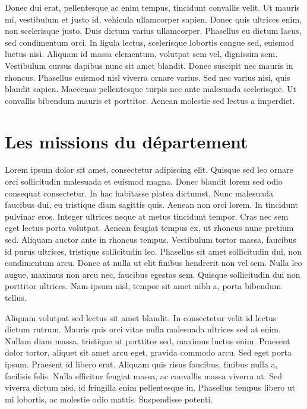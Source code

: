 \documentclass[a4paper,12pt]{report}
\begin{document}
Donec dui erat, pellentesque ac enim tempus, tincidunt convallis velit. Ut mauris mi, vestibulum et justo id, vehicula ullamcorper sapien. Donec quis ultrices enim, non scelerisque justo. Duis dictum varius ullamcorper. Phasellus eu dictum lacus, sed condimentum orci. In ligula lectus, scelerisque lobortis congue sed, euismod luctus nisi. Aliquam id massa elementum, volutpat sem vel, dignissim sem. Vestibulum cursus dapibus nunc sit amet blandit. Donec suscipit nec mauris in rhoncus. Phasellus euismod nisl viverra ornare varius. Sed nec varius nisi, quis blandit sapien. Maecenas pellentesque turpis nec ante malesuada scelerisque. Ut convallis bibendum mauris et porttitor. Aenean molestie sed lectus a imperdiet.

\section{Les missions du département} %
Lorem ipsum dolor sit amet, consectetur adipiscing elit. Quisque sed leo ornare orci sollicitudin malesuada et euismod magna. Donec blandit lorem sed odio consequat consectetur. In hac habitasse platea dictumst. Nunc malesuada faucibus dui, eu tristique diam sagittis quis. Aenean non orci lorem. In tincidunt pulvinar eros. Integer ultrices neque at metus tincidunt tempor. Cras nec sem eget lectus porta volutpat. Aenean feugiat tempus ex, ut rhoncus nunc pretium sed. Aliquam auctor ante in rhoncus tempus. Vestibulum tortor massa, faucibus id purus ultrices, tristique sollicitudin leo. Phasellus sit amet sollicitudin dui, non condimentum arcu. Donec at nulla ut elit finibus hendrerit non vel sem. Nulla leo augue, maximus non arcu nec, faucibus egestas sem. Quisque sollicitudin dui non porttitor ultrices. Nam ipsum nisl, tempor sit amet nibh a, porta bibendum tellus.

Aliquam volutpat sed lectus sit amet blandit. In consectetur velit id lectus dictum rutrum. Mauris quis orci vitae nulla malesuada ultrices sed at enim. Nullam diam massa, tristique ut porttitor sed, maximus luctus enim. Praesent dolor tortor, aliquet sit amet arcu eget, gravida commodo arcu. Sed eget porta ipsum. Praesent id libero erat. Aliquam quis risus faucibus, finibus nulla a, facilisis felis. Nulla efficitur feugiat massa, ac convallis massa viverra at. Sed viverra dictum nisi, id fringilla enim pellentesque in. Phasellus tempus libero ut mi lobortis, ac molestie odio mattis. Suspendisse potenti.
\end{document}
